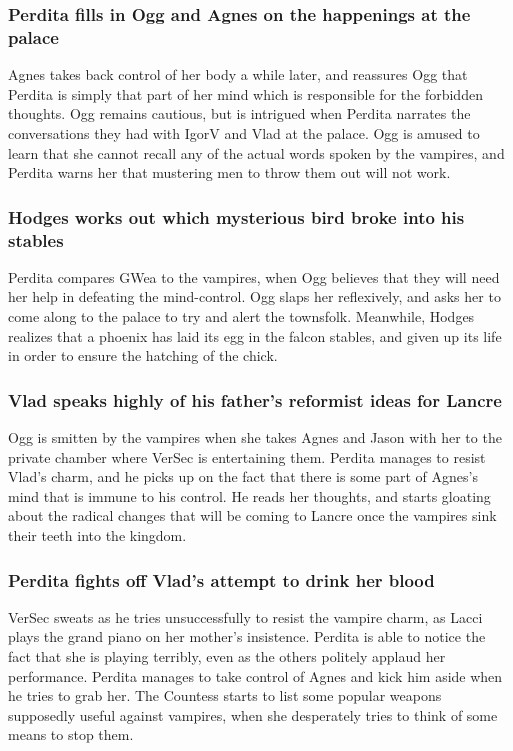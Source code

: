 \subsubsection{\Gls{Perdita} fills in \Gls{Ogg} and \Gls{Agnes} on the happenings at the palace}
\Gls{Agnes} takes back control of her body a while later, and reassures \Gls{Ogg} that \Gls{Perdita}
is simply that part of her mind which is responsible for the forbidden thoughts. \Gls{Ogg} remains
cautious, but is intrigued when \Gls{Perdita} narrates the conversations they had with \Gls{IgorV}
and \Gls{Vlad} at the palace. \Gls{Ogg} is amused to learn that she cannot recall any of the actual
words spoken by the vampires, and \Gls{Perdita} warns her that mustering men to throw them out will
not work.

\subsubsection{\Gls{Hodges} works out which mysterious bird broke into his stables}
\Gls{Perdita} compares \Gls{GWea} to the vampires, when \Gls{Ogg} believes that they will need her
help in defeating the mind-control. \Gls{Ogg} slaps her reflexively, and asks her to come along to
the palace to try and alert the townsfolk. Meanwhile, \Gls{Hodges} realizes that a phoenix has laid
its egg in the falcon stables, and given up its life in order to ensure the hatching of the chick.

\subsubsection{\Gls{Vlad} speaks highly of his father's reformist ideas for Lancre}
\Gls{Ogg} is smitten by the vampires when she takes \Gls{Agnes} and \Gls{Jason} with her to the
private chamber where \Gls{VerSec} is entertaining them. \Gls{Perdita} manages to resist
\Gls{Vlad}'s charm, and he picks up on the fact that there is some part of \Gls{Agnes}'s mind that
is immune to his control. He reads her thoughts, and starts gloating about the radical changes that
will be coming to Lancre once the vampires sink their teeth into the kingdom.

\subsubsection{\Gls{Perdita} fights off \Gls{Vlad}'s attempt to drink her blood}
\Gls{VerSec} sweats as he tries unsuccessfully to resist the vampire charm, as \Gls{Lacci} plays the
grand piano on her mother's insistence. \Gls{Perdita} is able to notice the fact that she is playing
terribly, even as the others politely applaud her performance. \Gls{Perdita} manages to take
control of \Gls{Agnes} and kick him aside when he tries to grab her. The \Gls{Countess} starts to
list some popular weapons supposedly useful against vampires, when she desperately tries to think
of some means to stop them.

